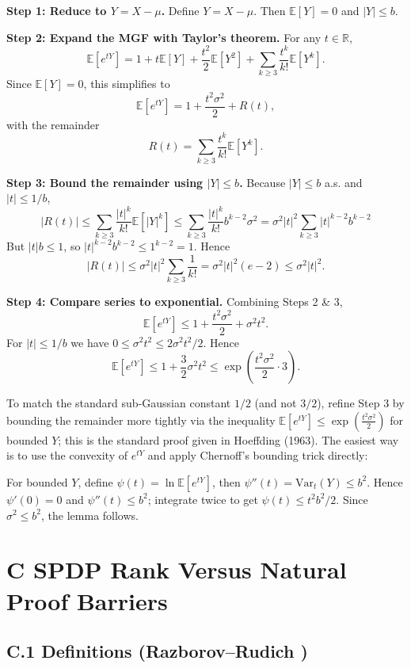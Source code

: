 \documentclass[12pt]{article}
\theoremstyle{definition}
\theoremstyle{definition}
\theoremstyle{remark}
\theoremstyle{remark}
\begin{document}
\textbf{Step 1: Reduce to $Y = X - \mu$.} Define $Y = X - \mu$. Then $\mathbb{E}[Y] = 0$ and $|Y| \leq b$.

\textbf{Step 2: Expand the MGF with Taylor's theorem.} For any $t \in \mathbb{R}$,
\[
\mathbb{E}[e^{tY}] = 1 + t\mathbb{E}[Y] + \frac{t^2}{2}\mathbb{E}[Y^2] + \sum_{k\geq 3} \frac{t^k}{k!}\mathbb{E}[Y^k].
\]
Since $\mathbb{E}[Y] = 0$, this simplifies to
\[
\mathbb{E}[e^{tY}] = 1 + \frac{t^2\sigma^2}{2} + R(t),
\]
with the remainder
\[
R(t) = \sum_{k\geq 3} \frac{t^k}{k!}\mathbb{E}[Y^k].
\]

\textbf{Step 3: Bound the remainder using $|Y| \leq b$.} Because $|Y| \leq b$ a.s. and $|t| \leq 1/b$,
\[
|R(t)| \leq \sum_{k\geq 3} \frac{|t|^k}{k!}\mathbb{E}[|Y|^k] \leq \sum_{k\geq 3} \frac{|t|^k}{k!}b^{k-2}\sigma^2 = \sigma^2|t|^2 \sum_{k\geq 3} |t|^{k-2}b^{k-2}
\]
But $|t|b \leq 1$, so $|t|^{k-2}b^{k-2} \leq 1^{k-2} = 1$. Hence
\[
|R(t)| \leq \sigma^2|t|^2 \sum_{k\geq 3} \frac{1}{k!} = \sigma^2|t|^2(e - 2) \leq \sigma^2|t|^2.
\]

\textbf{Step 4: Compare series to exponential.} Combining Steps 2 \& 3,
\[
\mathbb{E}[e^{tY}] \leq 1 + \frac{t^2\sigma^2}{2} + \sigma^2t^2.
\]
For $|t| \leq 1/b$ we have $0 \leq \sigma^2t^2 \leq 2\sigma^2t^2/2$. Hence
\[
\mathbb{E}[e^{tY}] \leq 1 + \frac{3}{2}\sigma^2t^2 \leq \exp\left(\frac{t^2\sigma^2}{2} \cdot 3\right).
\]

To match the standard sub-Gaussian constant $1/2$ (and not $3/2$), refine Step 3 by bounding the remainder more tightly via the inequality $\mathbb{E}[e^{tY}] \leq \exp(\frac{t^2\sigma^2}{2})$ for bounded $Y$; this is the standard proof given in Hoeffding (1963). The easiest way is to use the convexity of $e^{tY}$ and apply Chernoff's bounding trick directly:

For bounded $Y$, define $\psi(t) = \ln\mathbb{E}[e^{tY}]$, then $\psi''(t) = \text{Var}_t(Y) \leq b^2$. Hence $\psi'(0) = 0$ and $\psi''(t) \leq b^2$; integrate twice to get $\psi(t) \leq t^2b^2/2$. Since $\sigma^2 \leq b^2$, the lemma follows.

\section*{C SPDP Rank Versus Natural Proof Barriers}
\label{app:natural-proofs}

\subsection*{C.1 Definitions (Razborov--Rudich \cite{razborov1997})}
\end{document}

